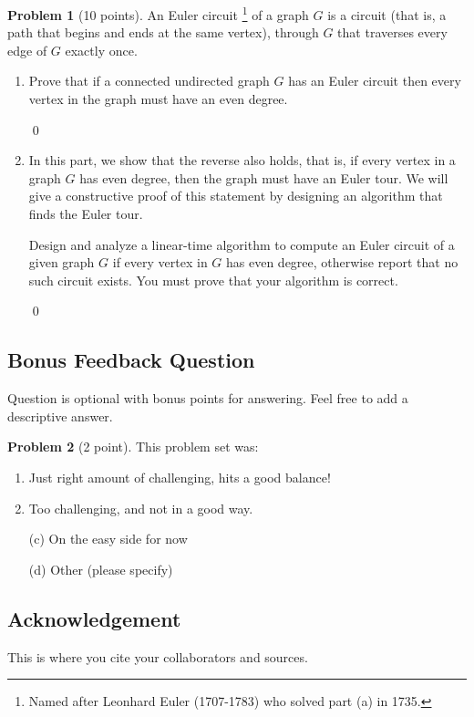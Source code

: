 \documentclass[12pt]{article}
\theoremstyle{definition}
\newtheorem{question}{Problem}
\newenvironment{solution}{\bigskip\noindent{\em Solution.}  \ignorespaces}{\hfill\qed}
\begin{document}
\begin{question}[10 points]
An Euler circuit \footnote{Named after Leonhard Euler (1707-1783) who solved part (a) in 1735.} of a graph $G$ is a circuit (that is, a path that begins and ends at the same vertex), through $G$ that traverses every edge of $G$ exactly once. 
\begin{enumerate}[label = (\alph*),noitemsep]
	\item Prove that if a connected undirected graph $G$ has an Euler circuit then every vertex in the graph must have an even degree.

   
        \begin{solution}

        \end{solution}

 
	\item 
        In this part, we show that the reverse also holds, that is, if every vertex in a graph $G$ has even degree, then the graph must have an Euler tour.
        We will give a constructive proof of this statement by designing an algorithm that finds the Euler tour.  

\smallskip 

 Design and analyze a linear-time algorithm to compute an Euler circuit of a given graph $G$ if every vertex in $G$ has even degree, otherwise report that no such circuit exists. You must prove that your algorithm is correct.

    \begin{solution}
    \end{solution}

\end{enumerate}

\end{question}


\newpage
\subsection*{Bonus Feedback Question}
Question is optional with bonus points for answering.  Feel free to add a descriptive answer.  

\begin{question}[2 point]
This problem set was:
\begin{multicols}{2}
\begin{enumerate}[noitemsep, label = (\alph*)]
    \item Just right amount of challenging, hits a good balance!
    \item Too challenging, and not in a good way.
\end{enumerate}
\columnbreak
\begin{itemize}[noitemsep]
    \item[(c)] On the easy side for now
    \item[(d)] Other (please specify)
\end{itemize}
\end{multicols}
\end{question}




\newpage

\subsection*{Acknowledgement}
This is where you cite your collaborators and sources.
\end{document}

